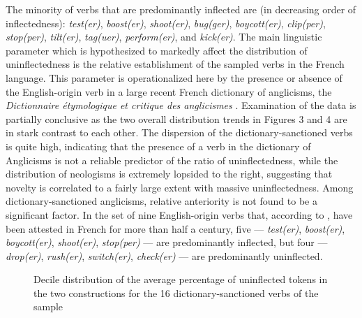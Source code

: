 \documentclass[output=paper]{langscibook}
\begin{document}
The minority of verbs that are predominantly inflected are (in decreasing order of inflectedness): \textit{test(er)}, \textit{boost(er)}, \textit{shoot(er)}, \textit{bug(ger)}, \textit{boycott(er)}, \textit{clip(per)}, \textit{stop(per)}, \textit{tilt(er)}, \textit{tag(uer)}, \textit{perform(er)}, and \textit{kick(er)}. The main linguistic parameter which is hypothesized to markedly affect the distribution of uninflectedness is the relative establishment of the sampled verbs in the French language. This parameter is operationalized here by the presence or absence of the English-origin verb in a large recent French dictionary of anglicisms, the \textit{Dictionnaire étymologique et critique des anglicismes} \citep{Weisman2020}. Examination of the data is partially conclusive as the two overall distribution trends in Figures 3 and 4 are in stark contrast to each other. The dispersion of the dictionary-sanctioned verbs is quite high, indicating that the presence of a verb in the dictionary of Anglicisms is not a reliable predictor of the ratio of uninflectedness, while the distribution of neologisms is extremely lopsided to the right, suggesting that novelty is correlated to a fairly large extent with massive uninflectedness. Among dictionary-sanctioned anglicisms, relative anteriority is not found to be a significant factor. In the set of nine English-origin verbs that, according to \citet{Weisman2020}, have been attested in French for more than half a century, five — \textit{test(er)}, \textit{boost(er)}, \textit{boycott(er)}, \textit{shoot(er)}, \textit{stop(per)} — are predominantly inflected, but four — \textit{drop(er)}, \textit{rush(er)}, \textit{switch(er)}, \textit{check(er)} — are predominantly uninflected.

  
 

\begin{stylelsTableHeading}\begin{figure}
\caption{Decile distribution of the average percentage of uninflected tokens in the two constructions for the 16 dictionary-sanctioned verbs of the sample}
\label{fig:key:3}
\end{figure}\end{stylelsTableHeading}

  
 
\end{document}
